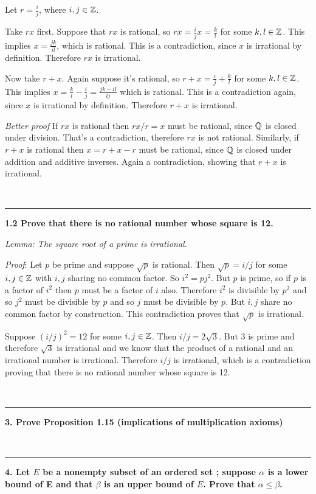 Let $r = \frac{i}{j}$, where $i, j \in \mathbb{Z}$.

Take $rx$ first. Suppose that $rx$ is rational, so $rx = \frac{i}{j}x =
\frac{k}{l}$ for some $k, l \in \mathbb{Z}$. This implies $x = \frac{jk}{il}$, which is
rational. This is a contradiction, since $x$ is irrational by
definition. Therefore $rx$ is irrational.

Now take $r + x$. Again suppose it's rational, so $r + x = \frac{i}{j} +
\frac{k}{l}$ for some $k, l \in \mathbb{Z}$. This implies $x = \frac{k}{l} -
\frac{i}{j} = \frac{jk - il}{lj}$ which is rational. This is a contradiction
again, since $x$ is irrational by definition. Therefore $r + x$ is irrational.

\textit{Better proof} If $rx$ is rational then $rx/r = x$ must be rational, since $\mathbb{Q}$
is closed under division. That's a contradiction, therefore $rx$ is not
rational. Similarly, if $r + x$ is rational then $x = r + x - r$ must be
rational, since $\mathbb{Q}$ is closed under addition and additive inverses. Again a
contradiction, showing that $r+x$ is irrational.

~\\\hrule
\textbf{1.2 Prove that there is no rational number whose square is 12.}

\textit{Lemma: The square root of a prime is irrational.}

\textit{Proof}: Let $p$ be prime and suppose $\sqrt{p}$ is rational. Then $\sqrt{p} =
i/j$ for some $i, j \in \mathbb{Z}$ with $i,j$ sharing no common factor. So $i^2 =
pj^2$. But $p$ is prime, so if $p$ is a factor of $i^2$ then $p$ must be a
factor of $i$ also. Therefore $i^2$ is divisible by $p^2$ and so $j^2$ must be
divisible by $p$ and so $j$ must be divisible by $p$. But $i,j$ share no common
factor by construction. This contradiction proves that $\sqrt{p}$ is
irrational.

Suppose $(i/j)^2 = 12$ for some $i,j \in \mathbb{Z}$. Then $i/j = 2\sqrt{3}$. But $3$
is prime and therefore $\sqrt{3}$ is irrational and we know that the product of
a rational and an irrational number is irrational. Therefore $i/j$ is
irrational, which is a contradiction proving that there is no rational number
whose square is 12.


~\\\hrule
\textbf{3. Prove Proposition 1.15 (implications of multiplication axioms)}

~\\\hrule
\textbf{4. Let $E$ be a nonempty subset of an ordered set ; suppose $\alpha$ is a
lower bound of E and that $\beta$ is an upper bound of $E$. Prove that $\alpha
\leq \beta$.}


